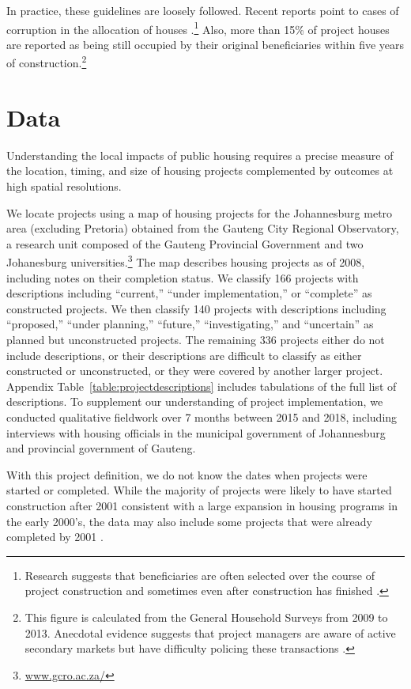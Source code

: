 \documentclass[12pt]{article}
\newcommand{\rv}{}
\begin{document}
In practice, these guidelines are loosely followed.  Recent reports point to cases of corruption in the allocation of houses \citep{seriq}.\footnote{Research suggests that beneficiaries are often selected over the course of project construction and sometimes even after construction has finished \citep{seriq}.}  Also, more than 15\% of project houses are reported as being still occupied by their original beneficiaries within five years of construction.\footnote{This figure is calculated from the General Household Surveys from 2009 to 2013. Anecdotal evidence suggests that project managers are aware of active secondary markets but have difficulty policing these transactions \citep{resale}.} 




\section{Data}\label{section:data}

Understanding the local impacts of public housing requires a precise measure of the location, timing, and size of housing projects complemented by outcomes at high spatial resolutions.

We locate projects using a map of housing projects \rv{for the Johannesburg metro area (excluding Pretoria)} obtained from the Gauteng City Regional Observatory, a research unit composed of the Gauteng Provincial Government and two Johanesburg universities.\footnote{\href{url}{www.gcro.ac.za/}}  The map describes housing projects as of 2008, including notes on their completion status.  We classify 166 projects with descriptions including ``current,'' ``under implementation,'' or ``complete'' as constructed projects.  We then classify 140 projects with descriptions including ``proposed,'' ``under planning,'' ``future,'' ``investigating,'' and ``uncertain'' as planned but unconstructed projects.  The remaining 336 projects either do not include descriptions, or their descriptions are difficult to classify as either constructed or unconstructed, or they were covered by another larger project.  Appendix Table~\ref{table:projectdescriptions} includes tabulations of the full list of descriptions.  To supplement our understanding of project implementation, we conducted qualitative fieldwork over 7 months between 2015 and 2018, including interviews with housing officials in the municipal government of Johannesburg and provincial government of Gauteng.  

\rv{With this project definition, we do not know the dates when projects were started or completed.  While the majority of projects were likely to have started construction after 2001 consistent with a large expansion in housing programs in the early 2000's, the data may also include some projects that were already completed by 2001  \citep{bng}.}
\end{document}
